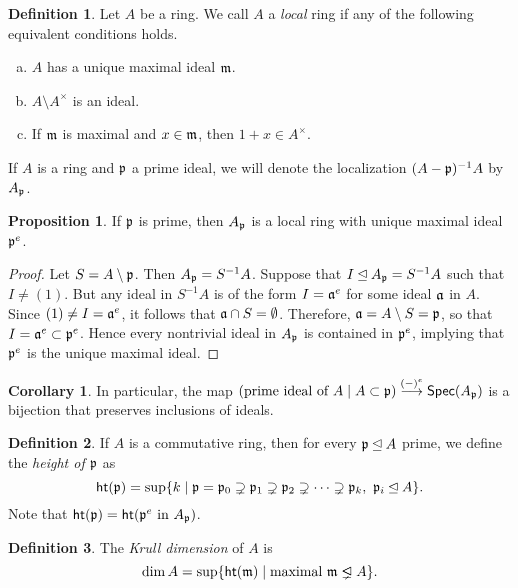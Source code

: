 \documentclass[10pt,letterpaper,cm]{nupset}
\theoremstyle{definition}
\newtheorem*{definition}{Definition}
\newtheorem{prop}{Proposition}
\newtheorem{corollary}{Corollary}
\newcommand{\1}{\mathbf{1}}
\newcommand{\p}{\frak{p}}
\newcommand{\0}{\vec 0}
\newcommand{\properideal}{%
  \mathrel{\ooalign{$\lneq$\cr\raise.22ex\hbox{$\lhd$}\cr}}}
\begin{document}
\begin{definition}
Let $A$ be a ring. We call $A$ a \textit{local} ring if any of the following equivalent conditions holds.
\begin{enumerate}[(a)]
\item $A$ has a unique maximal ideal $\frak{m}$.
\item $A \setminus A^{\times}$ is an ideal.
\item If $\frak{m}$ is maximal and $x\in \frak{m}$, then $1+x \in A^{\times}$. 
\end{enumerate}
If $A$ is a ring and $\p$ a prime ideal, we will denote the localization $(A- \p)^{-1}A $ by $A_{\p}$. 
\end{definition}

\begin{prop}
 If $\p$ is prime, then $A_{\p}$ is a local ring with unique maximal ideal $\p^e$.
\end{prop}
\begin{proof}
Let $S = A \setminus \p$. Then $A_{\p} = S^{-1}A$. Suppose that $I \unlhd A_{\p} = S^{-1}A$  such that $I \ne (1)$. But any ideal in $S^{-1}A$ is of the form $I = \frak{a}^e$ for some ideal $\frak{a}$ in $A$. Since $(1) \ne I = \frak{a}^e$, it follows that $\frak{a} \cap S = \emptyset$. Therefore, $\frak{a} = A \setminus S = \p$, so that $I= \frak{a}^e \subset \p^e$. Hence every nontrivial ideal in $A_{\p}$ is contained in $\p^e$, implying that $\p^e$ is the unique maximal ideal. 
\end{proof}

\begin{corollary}
In particular, the map $(\text{prime ideal of } A \mid A \subset \p) \overset{(-)^e}{\longrightarrow} \mathsf{Spec}(A_{\p})$ is a bijection that preserves inclusions of ideals. 
\end{corollary}

\begin{definition}
If $A$ is a commutative ring, then for every $\p \unlhd A$ prime, we define the \textit{height of $\p$} as $$\mathsf{ht}(\p) = \sup\{ k \mid \p = \p_0 \supsetneq \p_1 \supsetneq \p_2 \supsetneq \cdots \supsetneq \p_k, \  \p_i \unlhd A   \}. $$ Note that $\mathsf{ht}(\p) = \mathsf{ht}(\p^e \text{ in } A_{\p})$.
\end{definition}

\begin{definition}
The \textit{Krull dimension} of $A$ is $$ \dim{A} = \sup \{  \mathsf{ht}(\frak{m}) \mid \text{maximal } \frak{m} \properideal A \}  .$$
\end{definition}
\end{document}
